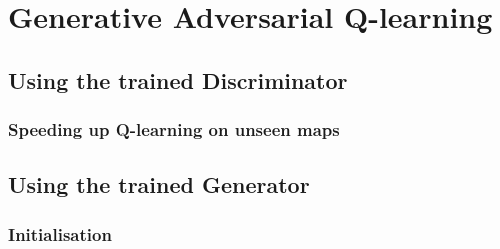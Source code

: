 
\chapter{Generative Adversarial Q-learning} %

\label{Chapter6}

\section{Using the trained Discriminator}
\subsection{Speeding up Q-learning on unseen maps}


\section{Using the trained Generator}
\subsection{Initialisation}

